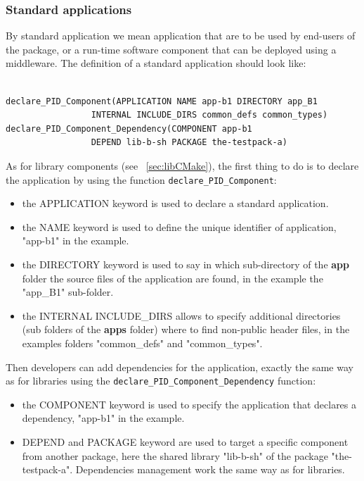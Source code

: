 \documentclass[12pt,a4paper]{article}
\begin{document}
\subsubsection{Standard applications}
\label{sec:appCMakeStandard}

By standard application we mean application that are to be used by end-users of the package, or a run-time software component that can be deployed using a middleware. The definition of a standard application  should look like:
\begin{verbatim}

declare_PID_Component(APPLICATION NAME app-b1 DIRECTORY app_B1
                 INTERNAL INCLUDE_DIRS common_defs common_types)
declare_PID_Component_Dependency(COMPONENT app-b1 
                 DEPEND lib-b-sh PACKAGE the-testpack-a)

\end{verbatim}

As for library components (see ~\ref{sec:libCMake}), the first thing to do is to declare the application by using the function \texttt{declare\_PID\_Component}:
\begin{itemize}
\item the APPLICATION keyword is used to declare a standard application.
\item the NAME keyword is used to define the unique identifier of application, "app-b1" in the example.
\item the DIRECTORY keyword is used to say in which sub-directory of the \textbf{app} folder the source files of the application are found, in the example the "app\_B1" sub-folder.
\item the INTERNAL INCLUDE\_DIRS allows to specify additional directories (sub folders of the \textbf{apps} folder) where to find non-public header files, in the examples folders "common\_defs" and "common\_types".
\end{itemize}

Then developers can add dependencies for the application, exactly the same way as for libraries using the  \texttt{declare\_PID\_Component\_Dependency} function:
\begin{itemize}
\item the COMPONENT keyword is used to specify the application that declares a dependency, "app-b1" in the example.
\item DEPEND and PACKAGE keyword are used to target a specific component from another package, here the shared library "lib-b-sh" of the package "the-testpack-a". Dependencies management work the same way as for libraries.
\end{itemize}
\end{document}
